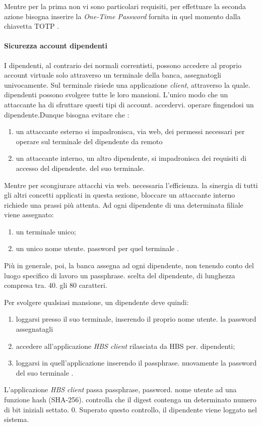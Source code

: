 Mentre per la prima non vi sono particolari requisiti, per effettuare la seconda azione bisogna inserire la \emph{One-Time Password} fornita in quel momento dalla chiavetta TOTP .



	\paragraph{Sicurezza account dipendenti}
I dipendenti, al contrario dei normali correntisti, possono accedere al proprio account virtuale solo attraverso un terminale  della banca, assegnatogli univocamente. Sul terminale risiede una applicazione \emph{client}, attraverso la quale. dipendenti possono svolgere tutte le loro mansioni. L'unico modo che un attaccante ha di sfruttare questi tipi di account. accedervi. operare fingendosi un dipendente.Dunque bisogna evitare che :
\begin{enumerate}
\item un attaccante esterno si impadronisca, via web, dei permessi necessari per operare sul terminale del dipendente da remoto
\item un attaccante interno, un altro dipendente, si impadronisca dei requisiti di accesso del dipendente. del suo terminale.
\end{enumerate}

Mentre per scongiurare attacchi via web. necessaria l'efficienza. la sinergia di tutti gli altri concetti applicati in questa sezione, bloccare un attaccante interno richiede una prassi più attenta.
Ad ogni dipendente di una determinata filiale viene assegnato:
\begin{enumerate}
\item un terminale unico;
\item un unico nome utente. password per quel terminale .
\end{enumerate}
Più in generale, poi, la banca assegna ad ogni dipendente, non tenendo conto del luogo specifico di lavoro un passphrase. scelta del dipendente, di lunghezza compresa tra. 40. gli 80 caratteri.


Per svolgere qualsiasi mansione, un dipendente deve quindi:
\begin{enumerate}
\item loggarsi presso il suo terminale, inserendo il proprio nome utente. la password assegnatagli
\item accedere all'applicazione \emph{HBS client} rilasciata da HBS per. dipendenti;
\item loggarsi in quell'applicazione inserendo il passphrase. nuovamente la password del suo terminale .
\end{enumerate}
L'applicazione \emph{HBS client} passa passphrase, password. nome utente ad una funzione hash (SHA-256). controlla che il digest contenga un determinato numero di bit iniziali settato. 0. Superato questo controllo, il dipendente viene loggato nel sistema.

